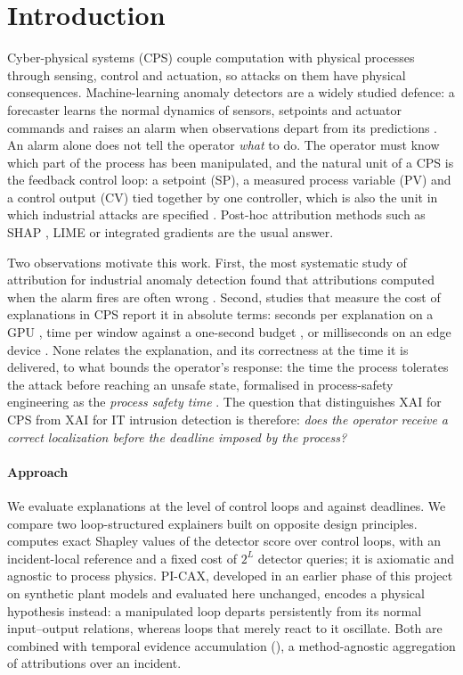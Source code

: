 \section{Introduction}\label{sec:intro}

Cyber-physical systems (CPS) couple computation with physical processes through sensing, control and actuation, so attacks on them have physical consequences. Machine-learning anomaly detectors are a widely studied defence: a forecaster learns the normal dynamics of sensors, setpoints and actuator commands and raises an alarm when observations depart from its predictions \citep{kravchik2018cnn,deng2021gdn,fung2024attributions}. An alarm alone does not tell the operator \emph{what} to do. The operator must know which part of the process has been manipulated, and the natural unit of a CPS is the feedback control loop: a setpoint (SP), a measured process variable (PV) and a control output (CV) tied together by one controller, which is also the unit in which industrial attacks are specified \citep{shin2021hai}. Post-hoc attribution methods such as SHAP \citep{lundberg2017shap}, LIME \citep{ribeiro2016lime} or integrated gradients \citep{sundararajan2017ig} are the usual answer.

Two observations motivate this work. First, the most systematic study of attribution for industrial anomaly detection found that attributions computed when the alarm fires are often wrong \citep{fung2024attributions}. Second, studies that measure the cost of explanations in CPS report it in absolute terms: seconds per explanation on a GPU \citep{oinonen2026substations}, time per window against a one-second budget \citep{franco2026shats}, or milliseconds on an edge device \citep{ericson2025wfcs}. None relates the explanation, and its correctness at the time it is delivered, to what bounds the operator's response: the time the process tolerates the attack before reaching an unsafe state, formalised in process-safety engineering as the \emph{process safety time} \citep{iec61511}. The question that distinguishes XAI for CPS from XAI for IT intrusion detection is therefore: \emph{does the operator receive a correct localization before the deadline imposed by the process?}

\paragraph{Approach} We evaluate explanations at the level of control loops and against deadlines. We compare two loop-structured explainers built on opposite design principles. \LX{} computes exact Shapley values of the detector score over control loops, with an incident-local reference and a fixed cost of $2^L$ detector queries; it is axiomatic and agnostic to process physics. PI-CAX, developed in an earlier phase of this project on synthetic plant models and evaluated here unchanged, encodes a physical hypothesis instead: a manipulated loop departs persistently from its normal input--output relations, whereas loops that merely react to it oscillate. Both are combined with temporal evidence accumulation (\TEA), a method-agnostic aggregation of attributions over an incident.

